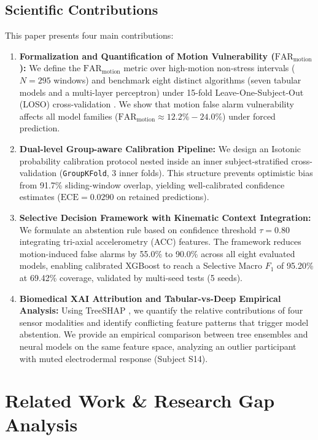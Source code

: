 \documentclass[conference]{IEEEtran}
\begin{document}
\subsection{Scientific Contributions}
This paper presents four main contributions:
\begin{enumerate}
    \item \textbf{Formalization and Quantification of Motion Vulnerability ($\text{FAR}_{\text{motion}}$):} We define the $\text{FAR}_{\text{motion}}$ metric over high-motion non-stress intervals ($N=295$ windows) and benchmark eight distinct algorithms (seven tabular models and a multi-layer perceptron) under 15-fold Leave-One-Subject-Out (LOSO) cross-validation \cite{saeb2017need, little2017using}. We show that motion false alarm vulnerability affects all model families ($\text{FAR}_{\text{motion}} \approx 12.2\% - 24.0\%$) under forced prediction.
    \item \textbf{Dual-level Group-aware Calibration Pipeline:} We design an Isotonic probability calibration protocol nested inside an inner subject-stratified cross-validation (\texttt{GroupKFold}, 3 inner folds). This structure prevents optimistic bias from 91.7\% sliding-window overlap, yielding well-calibrated confidence estimates ($\text{ECE} = 0.0290$ on retained predictions).
    \item \textbf{Selective Decision Framework with Kinematic Context Integration:} We formulate an abstention rule based on confidence threshold $\tau = 0.80$ integrating tri-axial accelerometry (ACC) features. The framework reduces motion-induced false alarms by 55.0\% to 90.0\% across all eight evaluated models, enabling calibrated XGBoost to reach a Selective Macro $F_1$ of 95.20\% at 69.42\% coverage, validated by multi-seed tests (5 seeds).
    \item \textbf{Biomedical XAI Attribution and Tabular-vs-Deep Empirical Analysis:} Using TreeSHAP \cite{lundberg2020local}, we quantify the relative contributions of four sensor modalities and identify conflicting feature patterns that trigger model abstention. We provide an empirical comparison between tree ensembles and neural models on the same feature space, analyzing an outlier participant with muted electrodermal response (Subject S14).
\end{enumerate}

\section{Related Work \& Research Gap Analysis}
\end{document}
